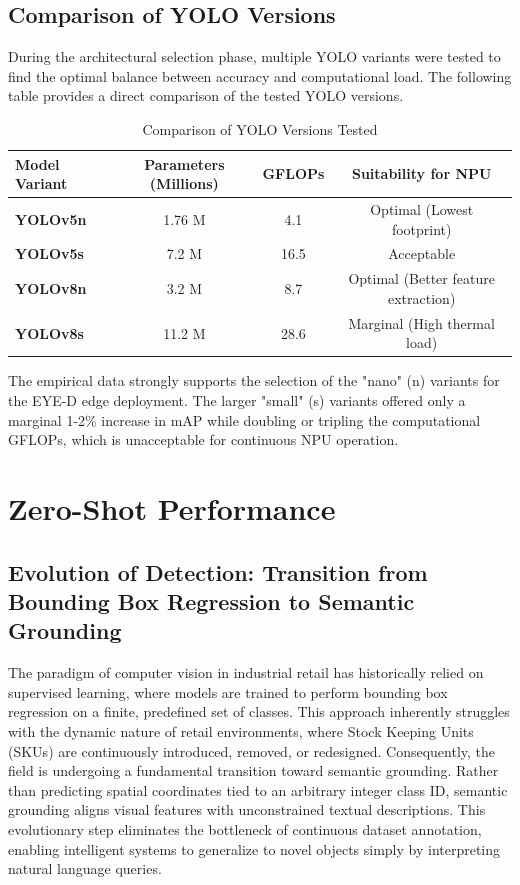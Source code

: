 \subsection{Comparison of YOLO Versions}
During the architectural selection phase, multiple YOLO variants were tested to find the optimal balance between accuracy and computational load. The following table provides a direct comparison of the tested YOLO versions.

\begin{table}[h]
\centering
\caption{Comparison of YOLO Versions Tested}
\renewcommand{\arraystretch}{1.2}
\begin{tabular}{|l|c|c|c|}
\hline
\textbf{Model Variant} & \textbf{Parameters (Millions)} & \textbf{GFLOPs} & \textbf{Suitability for NPU} \\
\hline
\textbf{YOLOv5n} & 1.76 M & 4.1 & Optimal (Lowest footprint) \\
\hline
\textbf{YOLOv5s} & 7.2 M & 16.5 & Acceptable \\
\hline
\textbf{YOLOv8n} & 3.2 M & 8.7 & Optimal (Better feature extraction) \\
\hline
\textbf{YOLOv8s} & 11.2 M & 28.6 & Marginal (High thermal load) \\
\hline
\end{tabular}
\end{table}

The empirical data strongly supports the selection of the "nano" (n) variants for the EYE-D edge deployment. The larger "small" (s) variants offered only a marginal 1-2\% increase in mAP while doubling or tripling the computational GFLOPs, which is unacceptable for continuous NPU operation.

\section{Zero-Shot Performance}

\subsection{Evolution of Detection: Transition from Bounding Box Regression to Semantic Grounding}
The paradigm of computer vision in industrial retail has historically relied on supervised learning, where models are trained to perform bounding box regression on a finite, predefined set of classes. This approach inherently struggles with the dynamic nature of retail environments, where Stock Keeping Units (SKUs) are continuously introduced, removed, or redesigned. Consequently, the field is undergoing a fundamental transition toward semantic grounding. Rather than predicting spatial coordinates tied to an arbitrary integer class ID, semantic grounding aligns visual features with unconstrained textual descriptions. This evolutionary step eliminates the bottleneck of continuous dataset annotation, enabling intelligent systems to generalize to novel objects simply by interpreting natural language queries.

